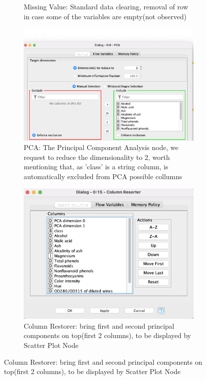 \documentclass[11pt]{article}
\begin{document}
\begin{figure}[H]
\begin{subfigure}{0.4\textwidth}
					\caption{Missing Value:  Standard data clearing, removal of row in case some of the variables are empty(not observed)}
					\label{fig:third}
				\end{subfigure}	
				\begin{subfigure}{0.4\textwidth}
					\includegraphics[width=\textwidth]{res/t1/t11/t11-PCA-conf}
					\caption{PCA: The Principal Component Analysis node, we request to reduce the dimensionality to 2, worth mentioning that, as 'class' is a string column, is automatically excluded from PCA possible collumns}
					\label{fig:first}
				\end{subfigure}
				\hfill
				\begin{subfigure}{0.4\textwidth}
					\includegraphics[width=\textwidth]{res/t1/t11/t11-column-resorter-conf}
					\caption{Column Restorer: bring first and second principal components on top(first 2 columns), to be displayed by Scatter Plot Node}
					\label{fig:second}
				\end{subfigure}
				\hfill
			\end{figure}
\end{document}
